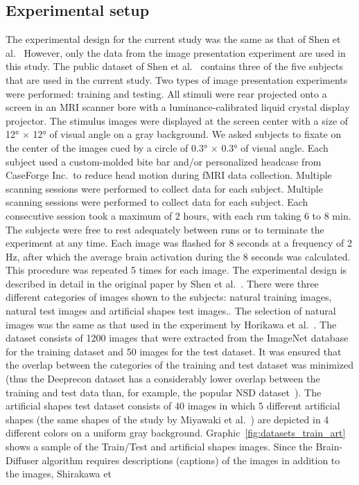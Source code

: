 \subsection{Experimental setup}
The experimental design for the current study was the same as that of Shen et al.~\cite{shenDeepImageReconstruction2019} However, only the data from the image presentation experiment are used in this study. The public dataset of Shen et al.~\cite{ds001506:1.3.1} contains three of the five subjects that are used in the current study.  Two types of image presentation experiments were performed: training and testing. All stimuli were rear projected onto a screen in an MRI scanner bore with a luminance-calibrated liquid crystal display projector. The stimulus images were displayed at the screen center with a size of 12° $\times$ 12° of visual angle on a gray background. We asked subjects to fixate on the center of the images cued by a circle of 0.3° $\times$ 0.3° of visual angle. Each subject used a custom-molded bite bar and/or personalized headcase from CaseForge Inc.\ to reduce head motion during fMRI data collection. Multiple scanning sessions were performed to collect data for each subject. Multiple scanning sessions were performed to collect data for each subject. Each consecutive session took a maximum of 2 hours, with each run taking 6 to 8 min. The subjects were free to rest adequately between runs or to terminate the experiment at any time. Each image was flashed for 8 seconds at a frequency of 2 Hz, after which the average brain activation during the 8 seconds was calculated. This procedure was repeated 5 times for each image. The experimental design is described in detail in the original paper by Shen et al.~\cite{shenDeepImageReconstruction2019}. There were three different categories of images shown to the subjects: natural training images, natural test images and artificial shapes test images.. The selection of natural images was the same as that used in the experiment by Horikawa et al.~\cite{horikawaGenericDecodingSeen2017}. The dataset consists of 1200 images that were extracted from the ImageNet database~\cite{dengImageNetLargescaleHierarchical2009} for the training dataset and 50 images for the test dataset. It was ensured that the overlap between the categories of the training and test dataset was minimized (thus the Deeprecon dataset has a considerably lower overlap between the training and test data than, for example, the popular NSD dataset~\cite{allenMassive7TFMRI2022,shirakawaSpuriousReconstructionBrain2024}). The artificial shapes test dataset consists of 40 images in which 5 different artificial shapes (the same shapes of the study by Miyawaki et al.~\cite{miyawakiVisualImageReconstruction2008}) are depicted in 4 different colors on a uniform gray background. Graphic~\ref{fig:datasets_train_art} shows a sample of the Train/Test and artificial shapes images. Since the Brain-Diffuser algorithm requires descriptions (captions) of the images in addition to the images, Shirakawa et 